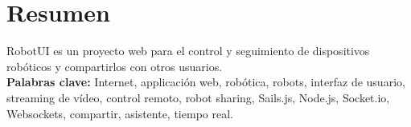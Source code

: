 \section*{Resumen}
\label{resumen}

RobotUI es un proyecto web para el control y seguimiento de dispositivos robóticos y compartirlos con otros usuarios.\\


\textbf{Palabras clave:} Internet, applicación web, robótica, robots, interfaz de usuario, streaming de vídeo, control remoto, robot sharing, Sails.js, Node.js, Socket.io, Websockets, compartir, 
asistente, tiempo real.
